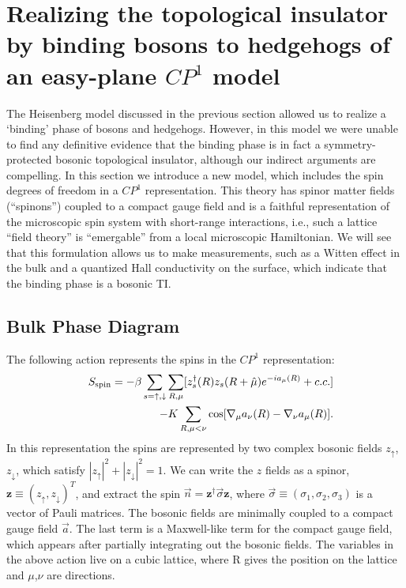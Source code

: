 \documentclass[prb,twocolumn]{revtex4-1}
\newcommand{\cp}{$CP^1$ }
\begin{document}

\section{Realizing the topological insulator by binding bosons to hedgehogs of an easy-plane \cp model}
\label{section::CP1}

The Heisenberg model discussed in the previous section allowed us to realize a `binding' phase of bosons and hedgehogs. However, in this model we were unable to find any definitive evidence that the binding phase is in fact a symmetry-protected bosonic topological insulator, although our indirect arguments are compelling. In this section we introduce a new model, which includes the spin degrees of freedom in a \cp representation. 
This theory has spinor matter fields (``spinons'') coupled to a compact gauge field and is a faithful representation of the microscopic spin system with short-range interactions, i.e., such a lattice ``field theory'' is ``emergable'' from a local microscopic Hamiltonian. We will see that this formulation allows us to make measurements, such as a Witten effect in the bulk and a quantized Hall conductivity on the surface, which indicate that the binding phase is a bosonic TI.

\subsection{Bulk Phase Diagram}
The following action represents the spins in the $CP^1$ representation:
\begin{eqnarray}
&&S_{\rm spin}=-\beta\sum_{s=\uparrow,\downarrow}\sum_{R,\mu} [z_s^\dagger(R)z_s(R+\hat\mu)e^{-ia_\mu(R)}+c.c.] \nonumber\\
&&-K\sum_{R,\mu<\nu} \cos[\nabla_\mu a_\nu(R)-\nabla_\nu a_\mu(R)].
\label{cp1action}
\end{eqnarray} 
In this representation the spins are represented by two complex bosonic fields $z_\uparrow$,$z_\downarrow$, which satisfy $|z_\uparrow|^2+|z_\downarrow|^2=1$. We can write the $z$ fields as a spinor, $\mathbf{z}\equiv(z_\uparrow,z_\downarrow)^T$, and extract the spin $\vec{n}=\mathbf{z^\dagger} \vec\sigma \mathbf{z}$, where $\vec{\sigma}\equiv (\sigma_1,\sigma_2,\sigma_3)$ is a vector of Pauli matrices.
The bosonic fields are minimally coupled to a compact gauge field $\vec{a}$. The last term is a Maxwell-like term for the compact gauge field, which appears after partially integrating out the bosonic fields. The variables in the above action live on a cubic lattice, where R gives the position on the lattice and $\mu$,$\nu$ are directions.
\end{document}
